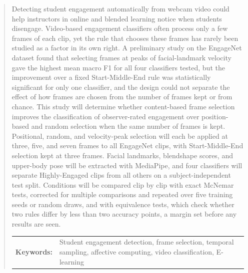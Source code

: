 \begin{abstract}
Detecting student engagement automatically from webcam video could help instructors in online and blended learning notice when students disengage. Video-based engagement classifiers often process only a few frames of each clip, yet the rule that chooses these frames has rarely been studied as a factor in its own right. A preliminary study on the EngageNet dataset found that selecting frames at peaks of facial-landmark velocity gave the highest mean macro F1 for all four classifiers tested, but the improvement over a fixed Start-Middle-End rule was statistically significant for only one classifier, and the design could not separate the effect of how frames are chosen from the number of frames kept or from chance. This study will determine whether content-based frame selection improves the classification of observer-rated engagement over position-based and random selection when the same number of frames is kept. Positional, random, and velocity-peak selection will each be applied at three, five, and seven frames to all EngageNet clips, with Start-Middle-End selection kept at three frames. Facial landmarks, blendshape scores, and upper-body pose will be extracted with MediaPipe, and four classifiers will separate Highly-Engaged clips from all others on a subject-independent test split. Conditions will be compared clip by clip with exact McNemar tests, corrected for multiple comparisons and repeated over five training seeds or random draws, and with equivalence tests, which check whether two rules differ by less than two accuracy points, a margin set before any results are seen.

\begin{flushleft}
\begin{tabular}{lp{4.25in}}
\hspace{-0.5em}\textbf{Keywords:}\hspace{0.25em} & Student engagement detection, frame selection, temporal sampling, affective computing, video classification, E-learning \\
\end{tabular}
\end{flushleft}
\end{abstract}
